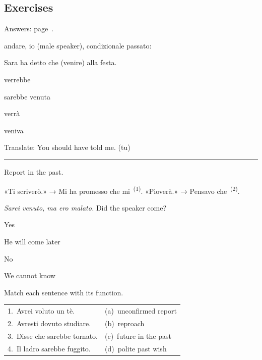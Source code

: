 \documentclass[11pt,a4paper,twoside,openright]{book}
\newcommand{\blank}{\underline{\hspace{2.6cm}}}
\newcommand{\clozeblank}[1]{\underline{\hspace{2.4cm}}\textsuperscript{\,(#1)}}
\newcommand{\answerline}{\par\vspace{6pt}\noindent\rule{0.75\linewidth}{0.4pt}\par}
\begin{document}
\subsection*{Exercises}\label{les:condizionale-passato:exercises}
{\color{muted}\small Answers: page~\pageref{ans:condizionale-passato}.}

\begin{exercises}
\item\label{ex:condizionale-passato-1}\relax andare, io (male speaker), condizionale passato: \blank{}
\item\label{ex:condizionale-passato-2}\relax Sara ha detto che \blank{} (venire) alla festa.\par\nopagebreak\begin{options}
\item\relax verrebbe
\item\relax sarebbe venuta
\item\relax verrà
\item\relax veniva
\end{options}
\item\label{ex:condizionale-passato-3}\relax Translate: You should have told me. (tu)\par\answerline
\item\label{ex:condizionale-passato-4}\relax Report in the past.\par\smallskip\begingroup\setlength{\parindent}{0pt}«Ti scriverò.» → Mi ha promesso che mi \clozeblank{1}. «Pioverà.» → Pensavo che \clozeblank{2}.\par\endgroup
\item\label{ex:condizionale-passato-5}\relax \textit{Sarei venuto, ma ero malato.} Did the speaker come?\par\nopagebreak\begin{options}
\item\relax Yes
\item\relax He will come later
\item\relax No
\item\relax We cannot know
\end{options}
\item\label{ex:condizionale-passato-6}\relax Match each sentence with its function.\par\smallskip\begin{tabularx}{\linewidth}{@{}L L@{}}
1.\ Avrei voluto un tè. & (a)\ unconfirmed report \\
2.\ Avresti dovuto studiare. & (b)\ reproach \\
3.\ Disse che sarebbe tornato. & (c)\ future in the past \\
4.\ Il ladro sarebbe fuggito. & (d)\ polite past wish \\
\end{tabularx}
\end{exercises}
\end{document}
